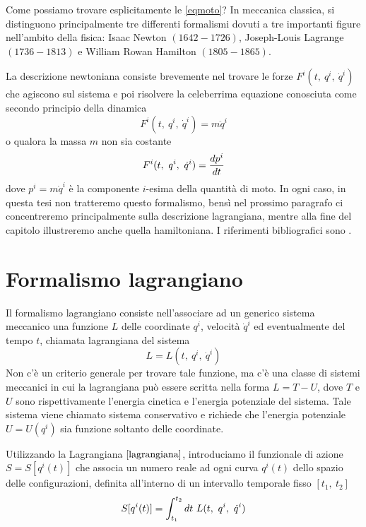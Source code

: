     Come possiamo trovare esplicitamente le \eqref{eqmoto}? In meccanica classica, si distinguono principalmente tre differenti formalismi dovuti a tre importanti figure nell'ambito della fisica: Isaac Newton $(1642-1726)$, Joseph-Louis Lagrange $(1736-1813)$ e William Rowan Hamilton $(1805-1865)$. 

    La descrizione newtoniana consiste brevemente nel trovare le forze $F^i(t, ~q^i, ~ \dot q^i)$ che agiscono sul sistema e poi risolvere la celeberrima equazione conosciuta come secondo principio della dinamica
    \begin{equation*}
        F^i(t, ~q^i, ~ \dot q^i) = m \ddot q^i
    \end{equation*}
    o qualora la massa $m$ non sia costante 
    \begin{equation*}
        F^i(t, ~q^i, ~ \dot q^i) = \frac{dp^i}{dt}
    \end{equation*}
    dove $p^i = m \dot q^i$ è la componente $i$-esima della quantità di moto. In ogni caso, in questa tesi non tratteremo questo formalismo, bensì nel prossimo paragrafo ci concentreremo principalmente sulla descrizione lagrangiana, mentre alla fine del capitolo illustreremo anche quella hamiltoniana. I riferimenti bibliografici sono \cite{landaumecc} \cite{goldstein} \cite{banados}.
    
\section{Formalismo lagrangiano}

    Il formalismo lagrangiano consiste nell'associare ad un generico sistema meccanico una funzione $L$ delle coordinate $q^i$, velocità $\dot q^i$ ed eventualmente del tempo $t$, chiamata lagrangiana del sistema
    \begin{equation} \label{lagrangiana}
        L = L(t, ~q^i, ~\dot q^i) 
    \end{equation}  
    Non c'è un criterio generale per trovare tale funzione, ma c'è una classe di sistemi meccanici in cui la lagrangiana può essere scritta nella forma $L = T - U$, dove $T$ e $U$ sono rispettivamente l'energia cinetica e l'energia potenziale del sistema. Tale sistema viene chiamato sistema conservativo e richiede che l'energia potenziale $U = U(q^i)$ sia funzione soltanto delle coordinate.
    
    Utilizzando la Lagrangiana $\eqref{lagrangiana}$, introduciamo il funzionale di azione $S = S[q^i(t)]$ che associa un numero reale ad ogni curva $q^i(t)$ dello spazio delle configurazioni, definita all'interno di un intervallo temporale fisso $[t_1, ~t_2]$
    \begin{equation} \label{azione}
        S[q^i(t)] = \int_{t_1}^{t_2}dt~ L(t, ~q^i, ~\dot q^i)
    \end{equation}

